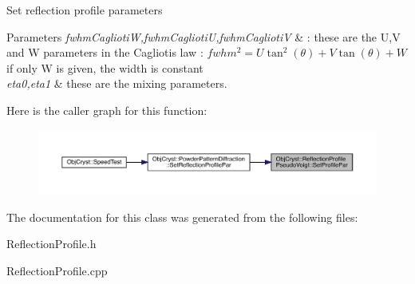 Set reflection profile parameters


\begin{DoxyParams}{Parameters}
{\em fwhm\+CagliotiW,fwhm\+CagliotiU,fwhm\+CagliotiV} & \+: these are the U,V and W parameters in the Caglioti\textquotesingle{}s law \+: $ fwhm^2= U \tan^2(\theta) + V \tan(\theta) +W $ if only W is given, the width is constant \\
\hline
{\em eta0,eta1} & these are the mixing parameters. \\
\hline
\end{DoxyParams}
Here is the caller graph for this function\+:
\nopagebreak
\begin{figure}[H]
\begin{center}
\leavevmode
\includegraphics[width=350pt]{class_obj_cryst_1_1_reflection_profile_pseudo_voigt_a41d53cb9c852d564d06c5ccb3ddfbcca_icgraph}
\end{center}
\end{figure}


The documentation for this class was generated from the following files\+:\begin{DoxyCompactItemize}
\item 
Reflection\+Profile.\+h\item 
Reflection\+Profile.\+cpp\end{DoxyCompactItemize}
